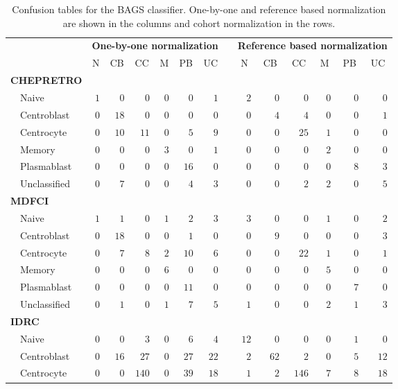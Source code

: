 \begin{table}[!tbp]
{\small
\caption{Confusion tables for the BAGS classifier. One-by-one and reference
based normalization are shown in the columns and cohort normalization in the
rows.\label{tab:BAGShemaclass}} 
\begin{center}
\begin{tabular}{lrrrrrrcrrrrrr}
\hline\hline
\multicolumn{1}{l}{\bfseries }&\multicolumn{6}{c}{\bfseries One-by-one normalization}&\multicolumn{1}{c}{\bfseries }&\multicolumn{6}{c}{\bfseries Reference based normalization}\tabularnewline
\cline{2-7} \cline{9-14}
\multicolumn{1}{l}{}&\multicolumn{1}{c}{N}&\multicolumn{1}{c}{CB}&\multicolumn{1}{c}{CC}&\multicolumn{1}{c}{M}&\multicolumn{1}{c}{PB}&\multicolumn{1}{c}{UC}&\multicolumn{1}{c}{}&\multicolumn{1}{c}{N}&\multicolumn{1}{c}{CB}&\multicolumn{1}{c}{CC}&\multicolumn{1}{c}{M}&\multicolumn{1}{c}{PB}&\multicolumn{1}{c}{UC}\tabularnewline
\hline
{\bfseries CHEPRETRO}&&&&&&&&&&&&&\tabularnewline
~~Naive&$1$&$ 0$&$  0$&$0$&$ 0$&$ 1$&&$ 2$&$ 0$&$  0$&$ 0$&$ 0$&$ 0$\tabularnewline
~~Centroblast&$0$&$18$&$  0$&$0$&$ 0$&$ 0$&&$ 0$&$ 4$&$  4$&$ 0$&$ 0$&$ 1$\tabularnewline
~~Centrocyte&$0$&$10$&$ 11$&$0$&$ 5$&$ 9$&&$ 0$&$ 0$&$ 25$&$ 1$&$ 0$&$ 0$\tabularnewline
~~Memory&$0$&$ 0$&$  0$&$3$&$ 0$&$ 1$&&$ 0$&$ 0$&$  0$&$ 2$&$ 0$&$ 0$\tabularnewline
~~Plasmablast&$0$&$ 0$&$  0$&$0$&$16$&$ 0$&&$ 0$&$ 0$&$  0$&$ 0$&$ 8$&$ 3$\tabularnewline
~~Unclassified&$0$&$ 7$&$  0$&$0$&$ 4$&$ 3$&&$ 0$&$ 0$&$  2$&$ 2$&$ 0$&$ 5$\tabularnewline
\hline
{\bfseries MDFCI}&&&&&&&&&&&&&\tabularnewline
~~Naive&$1$&$ 1$&$  0$&$1$&$ 2$&$ 3$&&$ 3$&$ 0$&$  0$&$ 1$&$ 0$&$ 2$\tabularnewline
~~Centroblast&$0$&$18$&$  0$&$0$&$ 1$&$ 0$&&$ 0$&$ 9$&$  0$&$ 0$&$ 0$&$ 3$\tabularnewline
~~Centrocyte&$0$&$ 7$&$  8$&$2$&$10$&$ 6$&&$ 0$&$ 0$&$ 22$&$ 1$&$ 0$&$ 1$\tabularnewline
~~Memory&$0$&$ 0$&$  0$&$6$&$ 0$&$ 0$&&$ 0$&$ 0$&$  0$&$ 5$&$ 0$&$ 0$\tabularnewline
~~Plasmablast&$0$&$ 0$&$  0$&$0$&$11$&$ 0$&&$ 0$&$ 0$&$  0$&$ 0$&$ 7$&$ 0$\tabularnewline
~~Unclassified&$0$&$ 1$&$  0$&$1$&$ 7$&$ 5$&&$ 1$&$ 0$&$  0$&$ 2$&$ 1$&$ 3$\tabularnewline
\hline
{\bfseries IDRC}&&&&&&&&&&&&&\tabularnewline
~~Naive&$0$&$ 0$&$  3$&$0$&$ 6$&$ 4$&&$12$&$ 0$&$  0$&$ 0$&$ 1$&$ 0$\tabularnewline
~~Centroblast&$0$&$16$&$ 27$&$0$&$27$&$22$&&$ 2$&$62$&$  2$&$ 0$&$ 5$&$12$\tabularnewline
~~Centrocyte&$0$&$ 0$&$140$&$0$&$39$&$18$&&$ 1$&$ 2$&$146$&$ 7$&$ 8$&$18$\tabularnewline

\end{tabular}
\end{center}}
\end{table}
